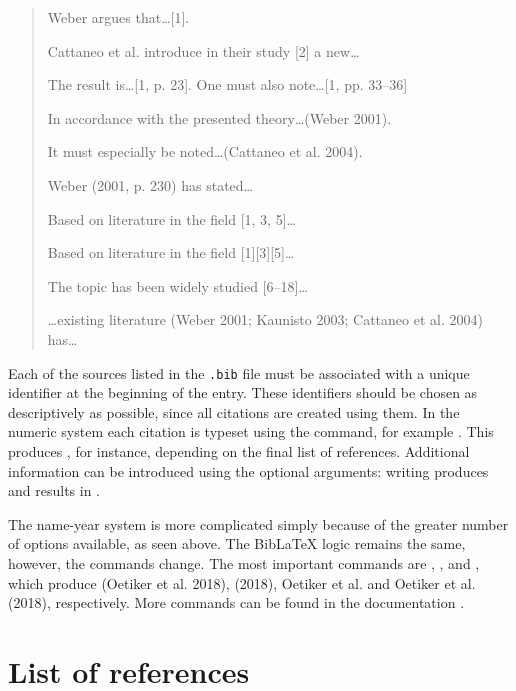 \begin{quotation}
\noindent Weber argues that\ldots [1].

\noindent Cattaneo et al. introduce in their study [2] a new\ldots

\noindent The result is\ldots [1, p. 23]. One must also note\ldots [1, pp. 33--36]

\noindent In accordance with the presented theory\ldots (Weber 2001).

\noindent It must especially be noted\ldots (Cattaneo et al. 2004).

\noindent Weber (2001, p. 230) has stated\ldots

\noindent Based on literature in the field [1, 3, 5]\ldots

\noindent Based on literature in the field [1][3][5]\ldots

\noindent The topic has been widely studied [6--18]\ldots

\noindent\ldots existing literature (Weber 2001; Kaunisto 2003; Cattaneo et al. 2004) has\ldots
\end{quotation}

Each of the sources listed in the \texttt{.bib} file must be associated with a unique identifier at the beginning of the entry. These identifiers should be chosen as descriptively as possible, since all citations are created using them. In the numeric system each citation is typeset using the  command, for example . This produces \cite{notsoshort}, for instance, depending on the final list of references. Additional information can be introduced using the optional arguments: writing  produces \cite[p. 30]{notsoshort} and  results in \cite[see][p. 30]{notsoshort}.

The name-year system is more complicated simply because of the greater number of options available, as seen above. The Bib\LaTeX{} logic remains the same, however, the commands change. The most important commands are , ,  and , which produce (Oetiker et al. 2018), (2018), Oetiker et al. and Oetiker et al. (2018), respectively. More commands can be found in the documentation \parencite{biblatex}.

\section{List of references}

